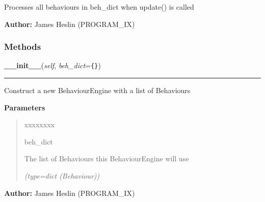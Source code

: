    \label{pystroke:behaviour_engine:BehaviourEngine}
Processes all behaviours in beh\_dict when update() is called

\textbf{Author:} James Heslin (PROGRAM\_IX)





  \subsubsection{Methods}

    \label{pystroke:behaviour_engine:BehaviourEngine:__init__}

    \vspace{0.5ex}

\hspace{.8\funcindent}\begin{boxedminipage}{\funcwidth}

    \raggedright \textbf{\_\_init\_\_}(\textit{self}, \textit{beh\_dict}={\tt \texttt{\{}\texttt{\}}})

    \vspace{-1.5ex}

    \rule{\textwidth}{0.5\fboxrule}
\setlength{\parskip}{2ex}
    Construct a new BehaviourEngine with a list of Behaviours

\setlength{\parskip}{1ex}
      \textbf{Parameters}
      \vspace{-1ex}

      \begin{quote}
        \begin{Ventry}{xxxxxxxx}

          \item[beh\_dict]

          The list of Behaviours this BehaviourEngine will use

            {\it (type=dict (Behaviour))}

        \end{Ventry}

      \end{quote}

\textbf{Author:} James Heslin (PROGRAM\_IX)



    \end{boxedminipage}

